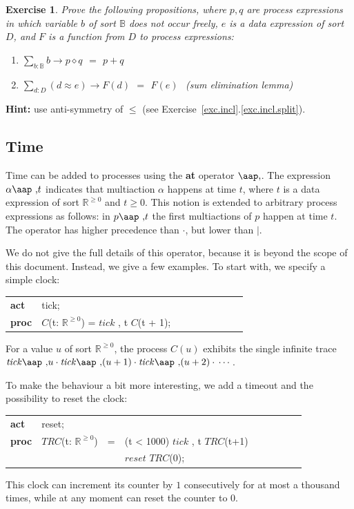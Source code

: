\documentclass[a4paper,fleqn]{article}
\makeatletter
\newtheorem{thexercise}[thdefinition]{Exercise}
\newenvironment{exercise}
  {\begin{thexercise}\em}
  {\end{thexercise}}
\newcommand{\f}[1]{\ensuremath{\mathit{#1}}}
\newcommand{\bool}{\ensuremath{\mathbb{B}}}
\newcommand{\nnreal}{\ensuremath{\mathbb{R}^{\geq 0}}}
\newcommand{\deffont}[1]{\textbf{#1}}
\newcommand{\seq}{\mathbin{\cdot}}
\newcommand{\alt}{\mathbin{+}}
\newcommand{\at}[1]{\mbox{\aap ,} #1}
\newenvironment{mcrl2}%
{\par\bigskip\noindent%
 \begin{tabular}{@{}>{\bf}p{2.3em}L@{\ }L@{\ }L@{\ }L@{\ }L@{\ }L@{\ }L@{\ }L}%
}%
{\end{tabular}\bigskip\par%
}
\makeatother
\begin{document}
\begin{exercise}
Prove the following propositions, where $p,q$ are process expressions in which
variable $b$ of sort $\bool$ does not occur freely, $e$ is a data expression of
sort $D$, and $F$ is a function from $D$ to process expressions:
\begin{enumerate}
\item $\sum_{b:\bool} b \to p \diamond q\ \,=\ \,p \alt q$
\item $\sum_{d:D} (d \approx e) \to F(d)\ \,=\ \,F(e)\ \,$ (sum elimination lemma)
\end{enumerate}
\end{exercise}
\deffont{Hint:} use anti-symmetry of $\leq$
(see Exercise~\ref{exc.incl}.\ref{exc.incl.split}).

\subsection{Time}

Time can be added to processes using the \deffont{at} operator $\at$. The
expression $\alpha \at t$ indicates that multiaction $\alpha$ happens at time
$t$, where $t$ is a data expression of sort $\nnreal$ and $t \geq 0$. This notion
is extended to arbitrary process expressions as follows: in $p \at t$ the first
multiactions of $p$ happen at time $t$. The operator has higher precedence than
$\seq$, but lower than $\mid$.

We do not give the full details of this operator, because it is beyond the
scope of this document. Instead, we give a few examples. To start with, we
specify a simple clock:
\begin{mcrl2}
act  & tick;\\
proc & \f{C}(t: \nnreal) = \f{tick} \at t \seq \f{C}(t + 1);\\
\end{mcrl2}
\noindent
For a value $u$ of sort $\nnreal$, the process $\f{C}(u)$ exhibits the single
infinite trace $\f{tick} \at u \seq \f{tick} \at (u+1) \seq \f{tick} \at (u+2)
\seq\,\cdots$.

To make the behaviour a bit more interesting, we add a timeout and the
possibility to reset the clock:
\begin{mcrl2}
act  & reset;\\
proc & \f{TRC}(t: \nnreal) & =    & (t < 1000) \to \f{tick} \at t \seq \f{TRC}(t+1)\\
     &                   & \alt & \f{reset} \seq \f{TRC}(0);\\
\end{mcrl2}
\noindent
This clock can increment its counter by $1$ consecutively for at most a
thousand times, while at any moment can reset the counter to $0$.
\end{document}
